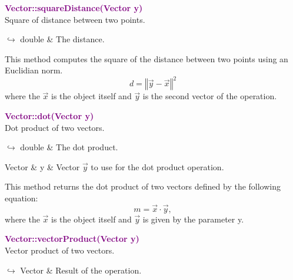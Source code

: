 \textcolor{purple}{\textbf{Vector::squareDistance(Vector y)}}\label{Vector::squareDistance(Vector y)}\\
Square of distance between two points.\vspace*{-0.5em}
\begin{tcolorbox}[grow to left by=-1cm, width=\textwidth-1cm,myArgs,tabularx={l|R}]
$\hookrightarrow$ double & The distance.
\end{tcolorbox}

This method computes the square of the distance between two points using an Euclidian norm.
\begin{equation*}
d = {\left\Vert \overrightarrow{y} - \overrightarrow{x} \right\Vert}^2
\end{equation*}
where the $\overrightarrow{x}$ is the object itself and $\overrightarrow{y}$ is the second vector of the operation.

\textcolor{purple}{\textbf{Vector::dot(Vector y)}}\label{Vector::dot(Vector y)}\\
Dot product of two vectors.\vspace*{-0.5em}
\begin{tcolorbox}[grow to left by=-1cm, width=\textwidth-1cm,myArgs,tabularx={l|R}]
$\hookrightarrow$ double & The dot product.
\end{tcolorbox}

\begin{tcolorbox}[width=\textwidth,myArgs,tabularx={ll|R}]
Vector & y & Vector $\overrightarrow{y}$ to use for the dot product operation.
\end{tcolorbox}

This method returns the dot product of two vectors defined by the following equation:
\begin{equation*}
m = \overrightarrow{x}\cdot\overrightarrow{y},
\end{equation*}
where the $\overrightarrow{x}$ is the object itself and $\overrightarrow{y}$ is given by the parameter y.

\textcolor{purple}{\textbf{Vector::vectorProduct(Vector y)}}\label{Vector::vectorProduct(Vector y)}\\
Vector product of two vectors.\vspace*{-0.5em}
\begin{tcolorbox}[grow to left by=-1cm, width=\textwidth-1cm,myArgs,tabularx={l|R}]
$\hookrightarrow$ Vector & Result of the operation.
\end{tcolorbox}


